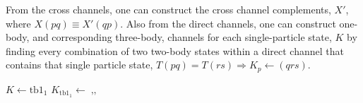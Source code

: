   From the cross channels, one can construct the cross channel
  complements, $X'$, where $X\left( pq\right)\equiv X'\left(
  qp\right)$. Also from the direct channels, one can construct
  one-body, and corresponding three-body, channels for each
  single-particle state, $K$ by finding every combination of two
  two-body states within a direct channel that contains that single
  particle state, $T\left( pq\right)=T\left( rs\right)\Rightarrow
  K_{p}\gets\left( qrs\right)$.

  \begin{algorithmic}
     
     \State $K\gets\text{tb1}_{1}$
    \State
    $K_{\text{tb1}_{1}}\gets\mathop{\text{tb1}_{2},\text{tb2}_{1},\text{tb2}_{2}}$
    \EndFor \EndFor \EndFor
  \end{algorithmic}

